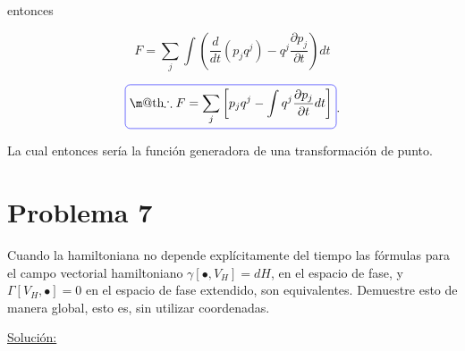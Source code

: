 \documentclass[a4paper,10pt]{article}
\makeatletter
\numberwithin{equation}{section}
\newcommand*{\boxcolor}{blue}
\renewcommand{\boxed}[1]{\textcolor{\boxcolor}{%
\tikz[baseline={([yshift=-1ex]current bounding box.center)}] \node [rectangle, minimum width=1ex,rounded corners,draw] {\normalcolor\m@th$\displaystyle#1$};}}
\makeatother
\begin{document}
entonces 

\begin{equation}
 F = \sum_j \int \left(\frac{d}{dt}(p_j q^j) - q^j\frac{\partial p_j}{\partial t}\right)dt
\end{equation}

\begin{equation}
 \boxed{\therefore F = \sum_j \left[p_j q^j - \int q^j \frac{\partial p_j}{\partial t}dt\right]}.
\end{equation}


La cual entonces sería la función generadora de una transformación de punto.











 



\section{Problema 7}

Cuando la hamiltoniana no depende explícitamente del tiempo las fórmulas para el 
campo vectorial hamiltoniano $\gamma[\bullet,V_H] = dH$, en el espacio de fase, 
y $\Gamma[V_H,\bullet] = 0$ en el espacio de fase extendido, son equivalentes. 
Demuestre esto de manera global, esto es, sin utilizar coordenadas.

\vspace{.3cm}

\underline{Solución:} \vspace{.3cm}
\end{document}
